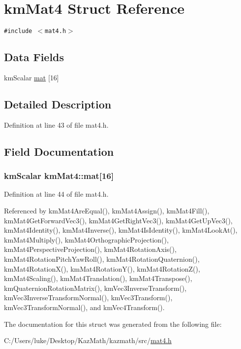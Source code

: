 \hypertarget{structkm_mat4}{
\section{kmMat4 Struct Reference}
\label{structkm_mat4}
}
{\tt \#include $<$mat4.h$>$}

\subsection*{Data Fields}
\begin{CompactItemize}
\item 
kmScalar \hyperlink{structkm_mat4_39a393fbd31604045d69a6af0fa3b34a}{mat} \mbox{[}16\mbox{]}
\end{CompactItemize}


\subsection{Detailed Description}


Definition at line 43 of file mat4.h.

\subsection{Field Documentation}
\hypertarget{structkm_mat4_39a393fbd31604045d69a6af0fa3b34a}{
\subsubsection[{mat}]{\setlength{\rightskip}{0pt plus 5cm}kmScalar {\bf kmMat4::mat}\mbox{[}16\mbox{]}}}
\label{structkm_mat4_39a393fbd31604045d69a6af0fa3b34a}




Definition at line 44 of file mat4.h.

Referenced by kmMat4AreEqual(), kmMat4Assign(), kmMat4Fill(), kmMat4GetForwardVec3(), kmMat4GetRightVec3(), kmMat4GetUpVec3(), kmMat4Identity(), kmMat4Inverse(), kmMat4IsIdentity(), kmMat4LookAt(), kmMat4Multiply(), kmMat4OrthographicProjection(), kmMat4PerspectiveProjection(), kmMat4RotationAxis(), kmMat4RotationPitchYawRoll(), kmMat4RotationQuaternion(), kmMat4RotationX(), kmMat4RotationY(), kmMat4RotationZ(), kmMat4Scaling(), kmMat4Translation(), kmMat4Transpose(), kmQuaternionRotationMatrix(), kmVec3InverseTransform(), kmVec3InverseTransformNormal(), kmVec3Transform(), kmVec3TransformNormal(), and kmVec4Transform().

The documentation for this struct was generated from the following file:\begin{CompactItemize}
\item 
C:/Users/luke/Desktop/KazMath/kazmath/src/\hyperlink{mat4_8h}{mat4.h}\end{CompactItemize}
